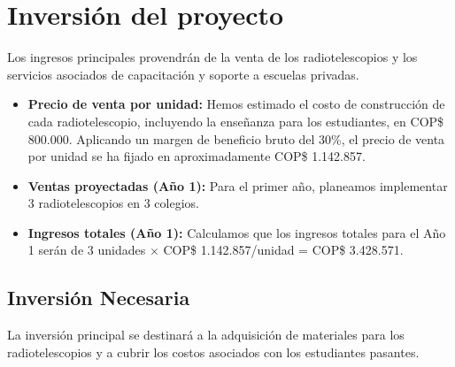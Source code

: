 \section{Inversión del proyecto}

Los ingresos principales provendrán de la venta de los radiotelescopios y los
servicios asociados de capacitación y soporte a escuelas privadas.

\begin{itemize}
  \item \textbf{Precio de venta por unidad:} Hemos estimado el costo de
    construcción de cada radiotelescopio, incluyendo la enseñanza para los
    estudiantes, en COP\$ 800.000. Aplicando un margen de beneficio bruto del
    30\%, el precio de venta por unidad se ha fijado en aproximadamente
    COP\$ 1.142.857.
  \item \textbf{Ventas proyectadas (Año 1):} Para el primer año, planeamos
    implementar 3 radiotelescopios en 3 colegios.
  \item \textbf{Ingresos totales (Año 1):} Calculamos que los ingresos
    totales para el Año 1 serán de 3 unidades
    $\times$ COP\$ 1.142.857/unidad = COP\$ 3.428.571.
\end{itemize}

\subsection{Inversión Necesaria}

La inversión principal se destinará a la adquisición de materiales para los
radiotelescopios y a cubrir los costos asociados con los estudiantes pasantes.

